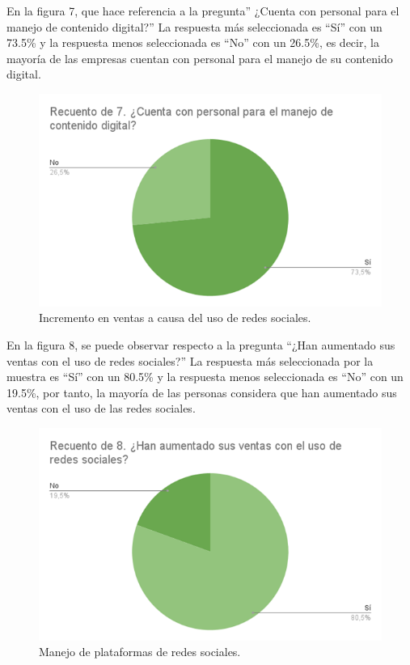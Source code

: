 \documentclass[12pt]{difu100cia} %
\begin{document}
	
En la figura 7, que hace referencia a la pregunta” ¿Cuenta con personal para el manejo de contenido digital?” La respuesta más seleccionada es “Sí” con un 73.5\% y la respuesta menos seleccionada es “No” con un 26.5\%, es decir, la mayoría de las empresas cuentan con personal para el manejo de su contenido digital.

\begin{figure}[!htb]
	\centering
	\includegraphics[width=\linewidth]{Figura 8.png}
	\caption{Incremento en ventas a causa del uso de redes sociales.}
	\label{Figur 8}
\end{figure}


En la figura 8, se puede observar respecto a la pregunta “¿Han aumentado sus ventas con el uso de redes sociales?” La respuesta más seleccionada por la muestra es “Sí” con un 80.5\% y la respuesta menos seleccionada es “No” con un 19.5\%, por tanto, la mayoría de las personas considera que han aumentado sus ventas con el uso de las redes sociales.

\begin{figure}[!htb]
	\centering
	\includegraphics[width=\linewidth]{Figura 9.png}
	\caption{Manejo de plataformas de redes sociales.}
	\label{Figur 9}
\end{figure}
	
\end{document}
